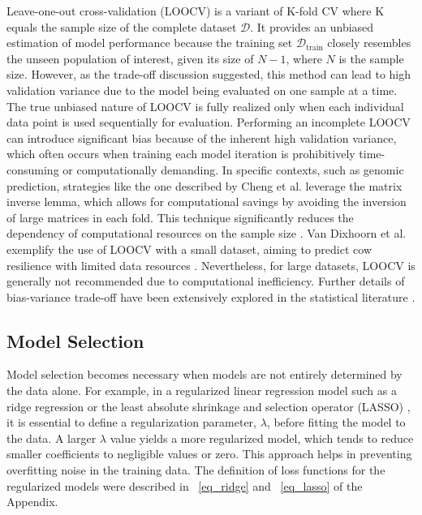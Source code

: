 Leave-one-out cross-validation (LOOCV) is a variant of K-fold CV where K equals the sample size of the complete dataset $\mathcal{D}$. It provides an unbiased estimation of model performance because the training set $\mathcal{D}_\text{train}$ closely resembles the unseen population of interest, given its size of $N - 1$, where $N$ is the sample size. However, as the trade-off discussion suggested, this method can lead to high validation variance due to the model being evaluated on one sample at a time. The true unbiased nature of LOOCV is fully realized only when each individual data point is used sequentially for evaluation. Performing an incomplete LOOCV can introduce significant bias because of the inherent high validation variance, which often occurs when training each model iteration is prohibitively time-consuming or computationally demanding. In specific contexts, such as genomic prediction, strategies like the one described by Cheng et al. leverage the matrix inverse lemma, which allows for computational savings by avoiding the inversion of large matrices in each fold. This technique significantly reduces the dependency of computational resources on the sample size \citep{cheng_efficient_2017}. Van Dixhoorn et al. exemplify the use of LOOCV with a small dataset, aiming to predict cow resilience with limited data resources \citep{van_dixhoorn_indicators_2018}. Nevertheless, for large datasets, LOOCV is generally not recommended due to computational inefficiency. Further details of bias-variance trade-off have been extensively explored in the statistical literature \citep{hastie_elements_2009, cawley_over-fitting_2010}.

\subsection{Model Selection}

Model selection becomes necessary when models are not entirely determined by the data alone. For example, in a regularized linear regression model such as a ridge regression \citep{hoerl_ridge_1970} or the least absolute shrinkage and selection operator (LASSO) \citep{tibshirani_regression_1996},  it is essential to define a regularization parameter, $\lambda$, before fitting the model to the data. A larger $\lambda$ value yields a more regularized model, which tends to reduce smaller coefficients to negligible values or zero. This approach helps in preventing overfitting noise in the training data. The definition of loss functions for the regularized models were described in ~\ref{eq_ridge} and ~\ref{eq_lasso} of the Appendix.

